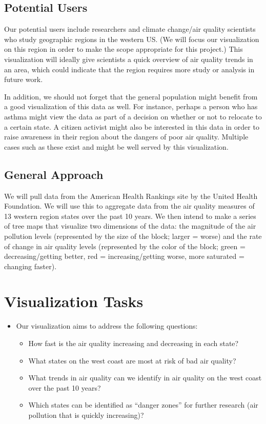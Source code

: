 \documentclass[journal]{vgtc}                %
\begin{document}
\subsection{Potential Users}
Our potential users include researchers and climate change/air quality scientists who study geographic regions in the 
western US. (We will focus our visualization on this region in order to make the scope appropriate for this project.) 
This visualization will ideally give scientists a quick overview of air quality trends in an area, which could 
indicate that the region requires more study or analysis in future work.

In addition, we should not forget that the general population might benefit from a good visualization of this data as 
well. For instance, perhaps a person who has asthma might view the data as part of a decision on whether or not to 
relocate to a certain state. A citizen activist might also be interested in this data in order to raise awareness in 
their region about the dangers of poor air quality. Multiple cases such as these exist and might be well served by 
this visualization.

\subsection{General Approach}
We will pull data from the American Health Rankings site by the United Health Foundation. We will use this to 
aggregate data from the air quality measures of 13 western region states over the past 10 years. We then intend to 
make a 
series of tree maps that visualize two dimensions of the data: the magnitude of the air pollution levels (represented 
by the size of the block; larger = worse) and the rate of change in air quality levels (represented by the color of 
the block; green = decreasing/getting better, red = increasing/getting worse, more saturated = changing faster).

\section{Visualization Tasks}

\begin{itemize}
\item Our visualization aims to address the following questions:
  \begin{itemize}
    \item How fast is the air quality increasing and decreasing in each state?
    \item What states on the west coast are most at risk of bad air quality?
    \item What trends in air quality can we identify in air quality on the west coast over the past 10 years?
    \item Which states can be identified as “danger zones” for further research (air pollution that is quickly increasing)?
  \end{itemize}
\end{itemize}
\end{document}
